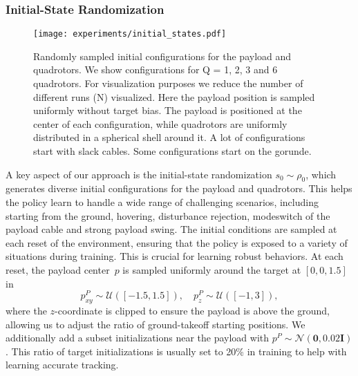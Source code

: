 \subsubsection{Initial-State Randomization}
\label{sec:reset}
\begin{figure}
    \centering
    \texttt{[image: experiments/initial\_states.pdf]}
    \caption[Initial States]{Randomly sampled initial configurations for the payload and quadrotors. We show configurations for Q = 1, 2, 3 and 6 quadrotors. For visualization purposes we reduce the number of different runs (N) visualized. Here the payload position is sampled uniformly without target bias. The payload is positioned at the center of each configuration, while quadrotors are uniformly distributed in a spherical shell around it. A lot of configurations start with slack cables. Some configurations start on the gorunde.}
    \label{fig:reset_config}
\end{figure}
A key aspect of our approach is the initial-state randomization $s_0\sim\rho_0$, which generates diverse initial configurations for the payload and quadrotors. This helps the policy learn to handle a wide range of challenging scenarios, including starting from the ground, hovering, disturbance rejection, modeswitch of the payload cable and strong payload swing. The initial conditions are sampled at each reset of the environment, ensuring that the policy is exposed to a variety of situations during training. This is crucial for learning robust behaviors. 
At each reset, the payload center~$p$ is sampled uniformly around the target at $[0,0,1.5]$ in
\begin{equation}
p^P_{xy}\sim\mathcal{U}([-1.5,1.5]),\quad p^P_z\sim\mathcal{U}([-1,3]),
\end{equation}
where the $z$-coordinate is clipped to ensure the payload is above the ground, allowing us to adjust the ratio of ground-takeoff starting positions. We additionally add a subset initializations near the payload with $p^P\sim\mathcal{N}(\mathbf{0},0.02\mathbf{I})$. This ratio of target initializations is usually set to 20\% in training to help with learning accurate tracking.

